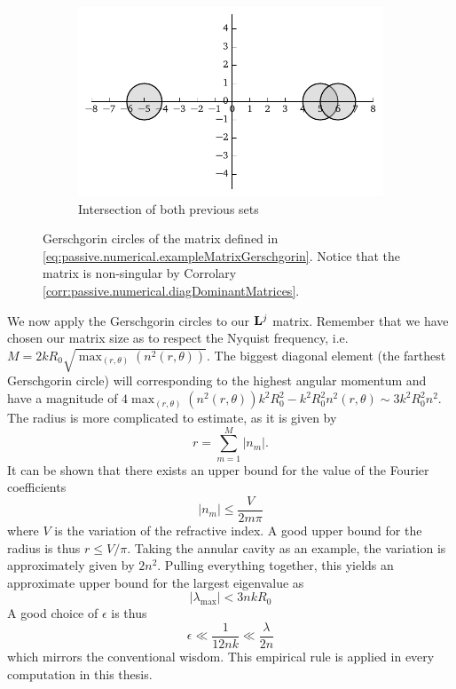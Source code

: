 \begin{figure}
 \begin{subfigure}{\textwidth}
  \centering
  \includegraphics{figs/passive/gerschgorin-full.pdf}
  \caption{Intersection of both previous sets}
 \end{subfigure}
 \caption[Gerschgorin circles for an example matrix]
	 {Gerschgorin circles of the matrix defined in \eqref{eq:passive.numerical.exampleMatrixGerschgorin}.
	 Notice that the matrix is non-singular by Corrolary \ref{corr:passive.numerical.diagDominantMatrices}.}
 \label{fig:passive.numerical.gerschgorinCircles}
\end{figure}

We now apply the Gerschgorin circles to our $\mathbf{L}^j$ matrix. 
Remember that we have chosen our matrix size as to respect the Nyquist frequency, 
i.e. $M=2kR_0\sqrt{\mathop{\max}_{(r,\theta)}\left(n^2(r,\theta)\right)}$. The biggest
diagonal element (the farthest Gerschgorin circle) will corresponding
to the highest angular momentum and have a magnitude of 
$4\mathop{\max}_{(r,\theta)}\left(n^2(r,\theta)\right)k^2R_0^2-k^2R_0^2n^2(r,\theta)\sim3k^2R_0^2n^2$.
The radius is more complicated to estimate, as it is given by 
  \begin{equation}
   r = \sum_{m=1}^M |n_m|.
  \end{equation}
It can be shown that there exists an upper bound for the value of the
Fourier coefficients \cite{JAC1920}
  \begin{equation}
   |n_m| \leq \frac{V}{2m\pi}
  \end{equation}
where $V$ is the variation of the refractive index. A good upper bound
for the radius is thus $r\leq V/\pi$. Taking the annular
cavity as an example, the variation is approximately given by 
$2n^2$. Pulling everything together, this yields an approximate upper
bound for the largest eigenvalue as
  \begin{equation}
   |\lambda_\text{max}| < 3nkR_0
  \end{equation}
A good choice of $\epsilon$ is thus
  \begin{equation}
   \epsilon \ll \frac{1}{12nk} \ll \frac{\lambda}{2n}
  \end{equation}
which mirrors the conventional wisdom. This empirical rule
is applied in every computation in this thesis.

